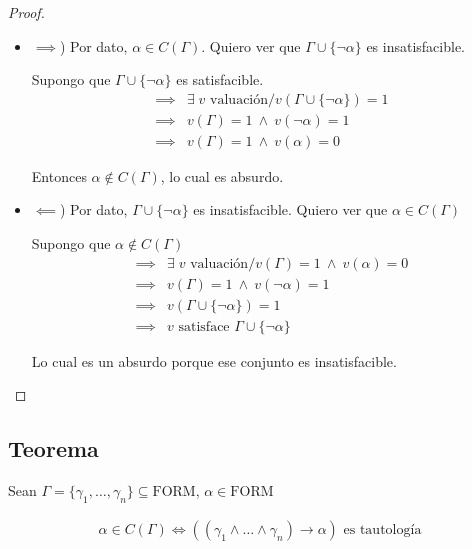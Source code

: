\begin{proof} \phantom{.}

    \begin{itemize}
        \item $\implies$) Por dato, $\alpha \in C(\Gamma)$. Quiero ver que
            $\Gamma \cup \{ \neg \alpha \}$ es insatisfacible.

            Supongo que $\Gamma \cup \{ \neg \alpha \}$ es satisfacible.
            \begin{align*}
                \implies& \exists  \; v \text{ valuación}/
                v\left(\Gamma \cup \{ \neg\alpha \}\right) = 1 \\
                \implies& v(\Gamma) = 1 ~ \wedge ~ v(\neg \alpha) = 1 \\
                \implies& v(\Gamma) = 1 ~ \wedge ~ v(\alpha) = 0
            \end{align*}

            Entonces $\alpha \notin C(\Gamma)$, lo cual es absurdo.

        \item $\impliedby$) Por dato, $\Gamma \cup \{ \neg\alpha \}$ es
            insatisfacible. Quiero ver que $\alpha \in C(\Gamma)$

            Supongo que $\alpha \notin C(\Gamma)$
            \begin{align*}
                \implies& \exists \; v \text{ valuación}/ v(\Gamma)=1 
                ~ \wedge ~ v(\alpha)= 0 \\
                \implies& v(\Gamma) = 1 ~ \wedge ~ v(\neg \alpha)=1 \\
                \implies& v(\Gamma \cup \{ \neg \alpha \}) = 1 \\
                \implies& v \text{ satisface } \Gamma \cup \{ \neg\alpha \}
            \end{align*}

            Lo cual es un absurdo porque ese conjunto es insatisfacible.
    \end{itemize}
\end{proof}

\subsection{Teorema}

%
\begin{teorema}{}{}
    Sean $\Gamma = \{ \gamma_1, \dotsc, \gamma_n \} \subseteq \mathrm{FORM}$, 
    $\alpha \in \mathrm{FORM}$

    \medskip

    \begin{gather*}
        \alpha \in C(\Gamma) \iff 
        \left( (\gamma_1 \wedge \dots \wedge \gamma_n) \to \alpha  \right) 
        \text{ es tautología}
    \end{gather*}
\end{teorema}

